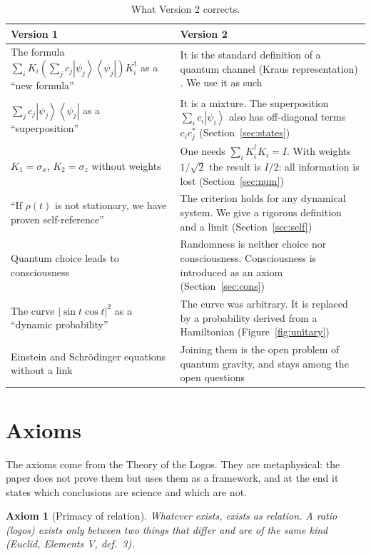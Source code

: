 \documentclass[a4paper,11pt]{article}
\newtheorem{axiom}{Axiom}
\theoremstyle{definition}
\newcommand{\ket}[1]{\left|#1\right\rangle}
\newcommand{\bra}[1]{\left\langle#1\right|}
\begin{document}
\begin{table}[h]
\centering
\small
\begin{tabular}{>{\raggedright}p{} >{\raggedright\arraybackslash}p{}}
\toprule
\textbf{Version 1} & \textbf{Version 2} \\
\midrule
The formula $\sum_i K_i(\sum_j c_j\ket{\psi_j}\bra{\psi_j})K_i^\dagger$ as a ``new formula'' & It is the standard definition of a quantum channel (Kraus representation) \cite{kraus,nielsen}. We use it as such \\
$\sum_j c_j\ket{\psi_j}\bra{\psi_j}$ as a ``superposition'' & It is a mixture. The superposition $\sum_i c_i\ket{\psi_i}$ also has off-diagonal terms $c_ic_j^*$ (Section~\ref{sec:states}) \\
$K_1=\sigma_x$, $K_2=\sigma_z$ without weights & One needs $\sum_i K_i^\dagger K_i=I$. With weights $1/\sqrt2$ the result is $I/2$: all information is lost (Section~\ref{sec:num}) \\
``If $\rho(t)$ is not stationary, we have proven self-reference'' & The criterion holds for any dynamical system. We give a rigorous definition and a limit (Section~\ref{sec:self}) \\
Quantum choice leads to consciousness & Randomness is neither choice nor consciousness. Consciousness is introduced as an axiom (Section~\ref{sec:cons}) \\
The curve $|\sin t\cos t|^2$ as a ``dynamic probability'' & The curve was arbitrary. It is replaced by a probability derived from a Hamiltonian (Figure~\ref{fig:unitary}) \\
Einstein and Schrödinger equations without a link & Joining them is the open problem of quantum gravity, and stays among the open questions \\
\bottomrule
\end{tabular}
\caption{What Version 2 corrects.}
\label{tab:fixes}
\end{table}

\section{Axioms}

The axioms come from the Theory of the Logos. They are metaphysical: the paper does not prove them but uses them as a framework, and at the end it states which conclusions are science and which are not.

\begin{axiom}[Primacy of relation]
Whatever exists, exists as relation. A ratio (\emph{logos}) exists only between two things that differ and are of the same kind (Euclid, \emph{Elements} V, def.~3).
\end{axiom}
\end{document}
